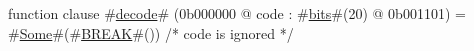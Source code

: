 function clause #\hyperref[zdecode]{decode}# (0b000000 @ code : #\hyperref[zbits]{bits}#(20) @ 0b001101) =
  #\hyperref[zSome]{Some}#(#\hyperref[zBREAK]{BREAK}#()) /* code is ignored */
